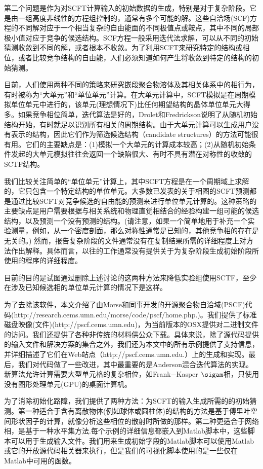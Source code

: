 \documentclass[12pt，a4paper]{article}
\numberwithin{equation}{section}
\begin{document}
第二个问题是作为对SCFT计算输入的初始数据的生成，特别是对于复杂阶段。它是由一组高度非线性的方程组控制的，通常有多个可能的解。这些自洽场(SCF)方程的不同解对应于一个相当复杂的自由能面的不同极值点或鞍点，其中不同的局部极小值对应于竞争的候选结构。SCF方程一般采用迭代法求解，可以从不同的初始猜测收敛到不同的解，或者根本不收敛。为了利用SCFT来研究特定的结构或相位，或者比较竞争结构的自由能，人们必须知道如何产生将收敛到特定的结构的初始猜测。

目前，人们使用两种不同的策略来研究嵌段聚合物溶体及其相关体系中的相行为，有时被称为“大单元”和“单位单元”计算。在大单元计算中，SCFT模拟是在周期模拟单位单元中进行的，该单元(理想情况下)比任何期望结构的晶体单位单元大得多。如果竞争相位简单，迭代算法是好的，Drolet和Fredrickson说明了从随机初始结构开始，有时就足以识别所有相关的周期结构。由于大单元计算可以生成用户没有表示的结构，因此它们作为筛选候选结构（candidate structures）的方法可能很有用。它们的主要缺点是：(1)模拟一个大单元的计算成本较高；(2)从随机初始条件发起的大单元模拟往往会返回一个缺陷很大、有时不具有潜在对称性的收敛的SCTF结构。

我们比较关注简单的“单位单元”计算上，其中SCFT方程是在一个周期域上求解的，它只包含一个特定结构的单位单元。大多数已发表的关于相图的SCFT预测都是通过比较SCFT对竞争候选的自由能的预测来进行单位单元计算的。这种策略的主要缺点是用户需要根据与相关系统和物理直觉相结合的经验构建一组可能的候选结构，以及预测一个没有预测的结构。(请注意，如果一个简单地用于补充一个实验测量，例如，从一个密度剖面，那么对称性通常是已知的，其他竞争相的存在是无关的。)
然而，报告复杂阶段的文件通常没有在复制结果所需的详细程度上对方法作出解释。具体而言，以往的工作通常没有提供关于为复杂阶段生成初始阶段所使用的程序的详细程度。

目前的目的是试图通过删除上述讨论的这两种方法来降低实验组使用SCTF，至少在涉及已知候选相的单位单元计算的情况下是这样。

为了去除该软件，本文介绍了由Morse和同事开发的开源聚合物自洽域(PSCF)代码(http://research.cems.umn.edu/morse/code/pscf/home.php.)。我们提供了标准磁盘映像(文件)(http://pscf.cems.umn.edu)，为当前版本的OSX提供对二进制文件的访问。我们还提供了各种非传统的材料供公众下载。具体来说，除了源代码提供的输入文件和解决方案的集合之外，我们还为本文中的所有示例提供了支持信息，并详细描述了它们在Web站点（http://pscf.cems.umn.edu.）上的生成和实现。最后，我们对代码做了一些改进，其中最重要的是Anderson混合迭代算法的实现。新算法允许计算需要大型单元格的复杂相位，如Frank−Kasper$~\sigam$相，只使用没有图形处理单元(GPU)的桌面计算机。

为了消除初始化路障，我们提供了两种方法：为SCFT的输入生成所需的的初始猜测。第一种适合于含有离散物体(例如球体或圆柱体)的结构的方法是基于傅里叶空间形状因子的计算，就像分析这些相位的散射时所做的那样。第二种更适合于网络相，是基于一种水平集方法.每个示例的详细信息都嵌入到Matlab脚本中，这些脚本可以用于生成输入文件。我们用来生成初始字段的Matlab脚本可以使用Matlab或它的开放源代码相关器来执行，但是我们的可视化脚本使用的是一些仅在Matlab中可用的函数。
\end{document}
